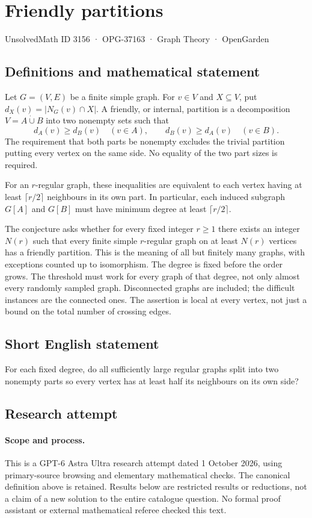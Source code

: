 \documentclass[11pt,a4paper]{article}
\begin{document}
\section*{Friendly partitions}\label{3156}
{\small UnsolvedMath ID 3156 · OPG-37163 · Graph Theory · OpenGarden}
\subsection{Definitions and mathematical statement}
Let $G=(V,E)$ be a finite simple graph. For $v\in V$ and
$X\subseteq V$, put $d_X(v)=|N_G(v)\cap X|$. A friendly, or
internal, partition is a decomposition
$V=A\mathbin{\dot\cup}B$ into two nonempty sets such that
\[
 d_A(v)\geq d_B(v)\quad(v\in A),\qquad
 d_B(v)\geq d_A(v)\quad(v\in B).
\]
The requirement that both parts be nonempty excludes the trivial
partition putting every vertex on the same side. No equality of
the two part sizes is required.

For an $r$-regular graph, these inequalities are equivalent to
each vertex having at least $\lceil r/2\rceil$ neighbours in its
own part. In particular, each induced subgraph $G[A]$ and $G[B]$
must have minimum degree at least $\lceil r/2\rceil$.

The conjecture asks whether for every fixed integer $r\geq1$
there exists an integer $N(r)$ such that every finite simple
$r$-regular graph on at least $N(r)$ vertices has a friendly
partition. This is the meaning of all but finitely many graphs,
with exceptions counted up to isomorphism. The degree is fixed
before the order grows. The threshold must work for every graph
of that degree, not only almost every randomly sampled graph.
Disconnected graphs are included; the difficult instances are
the connected ones. The assertion is local at every vertex,
not just a bound on the total number of crossing edges.
\subsection{Short English statement}
For each fixed degree, do all sufficiently large regular graphs split into two nonempty parts so every vertex has at least half its neighbours on its own side?
\subsection{Research attempt}
\paragraph{Scope and process.}
This is a GPT-6 Astra Ultra research attempt dated 1 October 2026, using
primary-source browsing and elementary mathematical checks. The canonical
definition above is retained. Results below are restricted results or
reductions, not a claim of a new solution to the entire catalogue question.
No formal proof assistant or external mathematical referee checked this text.
\end{document}
